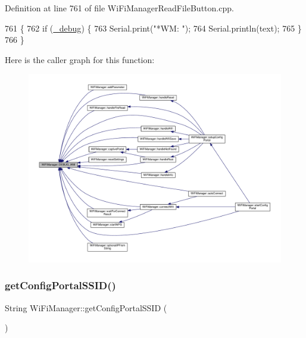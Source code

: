 Definition at line 761 of file Wi\+Fi\+Manager\+Read\+File\+Button.\+cpp.


\begin{DoxyCode}
761                                        \{
762   \textcolor{keywordflow}{if} (\hyperlink{class_wi_fi_manager_ac0f345f4a4c8bc38a49c8f87931b8cd4}{\_debug}) \{
763     Serial.print(\textcolor{stringliteral}{"*WM: "});
764     Serial.println(text);
765   \}
766 \}
\end{DoxyCode}
Here is the caller graph for this function\+:
\nopagebreak
\begin{figure}[H]
\begin{center}
\leavevmode
\includegraphics[width=350pt]{d4/dc8/class_wi_fi_manager_ae5f595c670ccbcf9a191baf50f5c7c26_icgraph}
\end{center}
\end{figure}
\mbox{\label{class_wi_fi_manager_a157dc79b810f8f8d338a6120b13f5c94}} 
\subsubsection{\texorpdfstring{get\+Config\+Portal\+S\+S\+I\+D()}{getConfigPortalSSID()}}
{\footnotesize\ttfamily String Wi\+Fi\+Manager\+::get\+Config\+Portal\+S\+S\+ID (\begin{DoxyParamCaption}{ }\end{DoxyParamCaption})}



